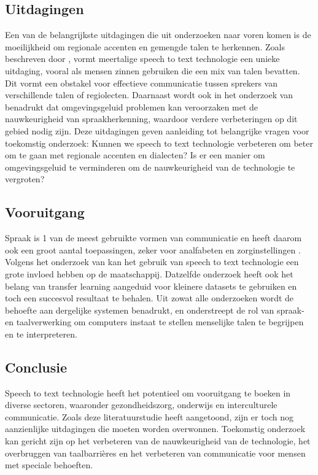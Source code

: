 \subsection{Uitdagingen}
Een van de belangrijkste uitdagingen die uit onderzoeken naar voren komen is de moeilijkheid om regionale accenten en gemengde talen te herkennen. 
Zoals beschreven door \cite{Reddy2022}, vormt meertalige speech to text technologie een unieke uitdaging, vooral als mensen zinnen gebruiken die een mix van talen bevatten. 
Dit vormt een obstakel voor effectieve communicatie tussen sprekers van verschillende talen of regiolecten. Daarnaast wordt ook in het onderzoek van \cite{ajami2016use} benadrukt dat omgevingsgeluid problemen kan veroorzaken met de nauwkeurigheid van spraakherkenning, waardoor verdere verbeteringen op dit gebied nodig zijn.
Deze uitdagingen geven aanleiding tot belangrijke vragen voor toekomstig onderzoek: Kunnen we speech to text technologie verbeteren om beter om te gaan met regionale accenten en dialecten? Is er een manier om omgevingsgeluid te verminderen om de nauwkeurigheid van de technologie te vergroten?


\subsection{Vooruitgang}
Spraak is 1 van de meest gebruikte vormen van communicatie en heeft daarom ook een groot aantal toepassingen, zeker voor analfabeten en zorginstellingen \cite{Arun2021}. Volgens het onderzoek van \cite{Roepke2019} kan het gebruik van speech to text technologie een grote invloed hebben op de maatschappij. Datzelfde onderzoek heeft ook het belang van transfer learning aangeduid voor kleinere datasets te gebruiken en toch een succesvol resultaat te behalen. Uit zowat alle onderzoeken wordt de behoefte aan dergelijke systemen benadrukt, en onderstreept de rol van spraak- en taalverwerking om computers instaat te stellen menselijke talen te begrijpen en te interpreteren.

\subsection{Conclusie}
Speech to text technologie heeft het potentieel om vooruitgang te boeken in diverse sectoren, waaronder gezondheidszorg, onderwijs en interculturele communicatie. Zoals deze literatuurstudie heeft aangetoond, zijn er toch nog aanzienlijke uitdagingen die moeten worden overwonnen. Toekomstig onderzoek kan gericht zijn op het verbeteren van de nauwkeurigheid van de technologie, het overbruggen van taalbarrières en het verbeteren van communicatie voor mensen met speciale behoeften.

